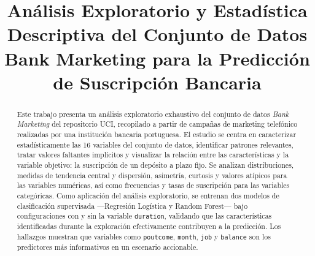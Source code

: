 \documentclass[conference]{IEEEtran}
\begin{document}
\title{Análisis Exploratorio y Estadística Descriptiva del Conjunto de Datos Bank Marketing para la Predicción de Suscripción Bancaria}

\author{
    \and
}

\maketitle

\begin{abstract}
Este trabajo presenta un análisis exploratorio exhaustivo del conjunto de datos \textit{Bank Marketing} del repositorio UCI, recopilado a partir de campañas de marketing telefónico realizadas por una institución bancaria portuguesa. El estudio se centra en caracterizar estadísticamente las 16 variables del conjunto de datos, identificar patrones relevantes, tratar valores faltantes implícitos y visualizar la relación entre las características y la variable objetivo: la suscripción de un depósito a plazo fijo. Se analizan distribuciones, medidas de tendencia central y dispersión, asimetría, curtosis y valores atípicos para las variables numéricas, así como frecuencias y tasas de suscripción para las variables categóricas. Como aplicación del análisis exploratorio, se entrenan dos modelos de clasificación supervisada —Regresión Logística y Random Forest— bajo configuraciones con y sin la variable \texttt{duration}, validando que las características identificadas durante la exploración efectivamente contribuyen a la predicción. Los hallazgos muestran que variables como \texttt{poutcome}, \texttt{month}, \texttt{job} y \texttt{balance} son los predictores más informativos en un escenario accionable.
\end{abstract}
\end{document}
